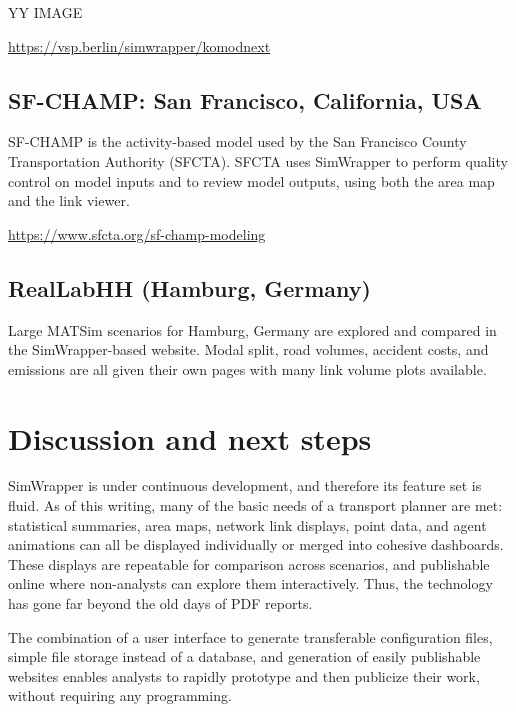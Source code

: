 \documentclass[3p,times,procedia]{elsarticle}
\begin{document}
YY IMAGE

\url{https://vsp.berlin/simwrapper/komodnext}


\subsection{SF-CHAMP: San Francisco, California, USA}

SF-CHAMP is the activity-based model used by the San Francisco County Transportation Authority (SFCTA). SFCTA uses SimWrapper to perform quality control on model inputs and to review model outputs, using both the area map and the link viewer.

\url{https://www.sfcta.org/sf-champ-modeling}

\subsection{RealLabHH (Hamburg, Germany)}

Large MATSim scenarios for Hamburg, Germany are explored and compared in the SimWrapper-based website. Modal split, road volumes, accident costs, and emissions are all given their own pages with many link volume plots available.


\section{Discussion and next steps}

SimWrapper is under continuous development, and therefore its feature set is fluid. As of this writing, many of the basic needs of a transport planner are met: statistical summaries, area maps, network link displays, point data, and agent animations can all be displayed individually or merged into cohesive dashboards. These displays are repeatable for comparison across scenarios, and publishable online where non-analysts can explore them interactively. Thus, the technology has gone far beyond the old days of PDF reports.

The combination of a user interface to generate transferable configuration files, simple file storage instead of a database, and generation of easily publishable websites enables analysts to rapidly prototype and then publicize their work, without requiring any programming.
\end{document}
